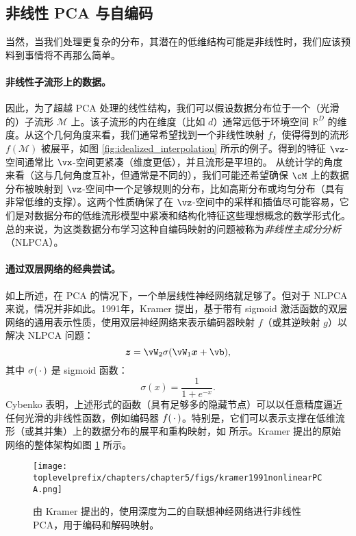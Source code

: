 \documentclass[../../book-main.tex]{subfiles}
\begin{document}
\subsection{非线性 PCA 与自编码}\label{sub:nonlinear-pca}\label{sec:NLPCA}
当然，当我们处理更复杂的分布，其潜在的低维结构可能是非线性时，我们应该预料到事情将不再那么简单。

\paragraph{非线性子流形上的数据。} 因此，为了超越 PCA 处理的线性结构，我们可以假设数据分布位于一个（光滑的）子流形 $\mathcal{M}$ 上。该子流形的内在维度（比如 $d$）通常远低于环境空间 $\mathbb{R}^D$ 的维度。从这个几何角度来看，我们通常希望找到一个非线性映射 $f$，使得得到的流形 $f(\mathcal{M})$ 被展平，如图 \ref{fig:idealized_interpolation} 所示的例子。得到的特征 $\vz$-空间通常比 $\vx$-空间更紧凑（维度更低），并且流形是平坦的。
从统计学的角度来看（这与几何角度互补，但通常是不同的），我们可能还希望确保 $\cM$ 上的数据分布被映射到 $\vz$-空间中一个足够规则的分布，比如高斯分布或均匀分布（具有非常低维的支撑）。这两个性质确保了在 $\vz$-空间中的采样和插值尽可能容易，它们是对数据分布的低维流形模型中紧凑和结构化特征这些理想概念的数学形式化。
总的来说，为这类数据分布学习这种自编码映射的问题被称为{\em 非线性主成分分析}（NLPCA）。

\paragraph{通过双层网络的经典尝试。} 如上所述，在 PCA 的情况下，一个单层线性神经网络就足够了。但对于 NLPCA 来说，情况并非如此。1991年，Kramer \cite{Kramer1991NonlinearPC} 提出，基于带有 sigmoid 激活函数的双层网络的通用表示性质，使用双层神经网络来表示编码器映射 $f$（或其逆映射 $g$）以解决 NLPCA 问题：
\begin{equation}
  \z = \vW_2 \sigma(\vW_1\x +\vb),
\end{equation}
其中 $\sigma(\,\cdot\,)$ 是 sigmoid 函数：
\begin{equation}
  \sigma(x) = \frac{1}{1+ e^{-x}}.
\end{equation}
Cybenko \cite{Cybenko1989ApproximationBS} 表明，上述形式的函数（具有足够多的隐藏节点）可以以任意精度逼近任何光滑的非线性函数，例如编码器 $f(\,\cdot\,)$。特别是，它们可以表示支撑在低维流形（或其并集）上的数据分布的展平和重构映射，如  所示。Kramer 提出的原始网络的整体架构如图 \ref{fig:NLPCA} 所示。
\begin{figure}[tb]
  \centering
  \texttt{[image: \\toplevelprefix/chapters/chapter5/figs/kramer1991nonlinearPCA.png]}
  \caption{由 Kramer \cite{Kramer1991NonlinearPC} 提出的，使用深度为二的自联想神经网络进行非线性 PCA，用于编码和解码映射。}
  \label{fig:NLPCA}
\end{figure}
\end{document}
